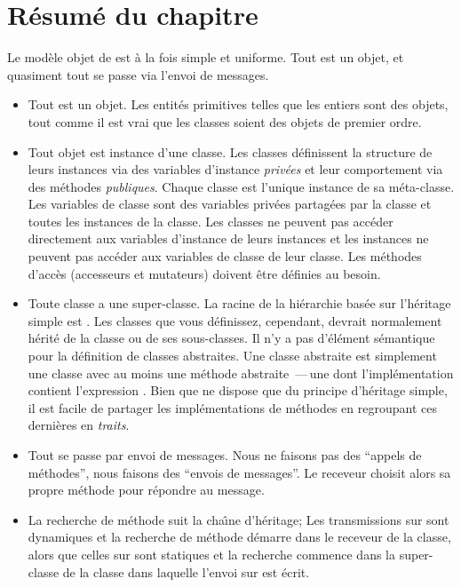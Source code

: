 \documentclass[a4paper,10pt,twoside]{book}
\begin{document}
\section{R\'esum\'e du chapitre}

Le mod\`ele objet de \squeak est \`a la fois simple et uniforme.
Tout est un objet, et quasiment tout se passe via l'envoi de messages.

\begin{itemize}
  \item Tout est un objet.
  Les entit\'es primitives telles que les entiers sont des objets, tout comme
il est vrai que les classes soient des objets de premier ordre.

  \item Tout objet est instance d'une classe.
Les classes d\'efinissent la structure de leurs instances via des
variables d'instance \emph{priv\'ees} et leur comportement 
via des m\'ethodes \emph{publiques}. Chaque classe est l'unique
instance de sa m\'eta-classe.
Les variables de classe sont des variables priv\'ees partag\'ees par la classe
et toutes les instances de la classe.
Les classes ne peuvent pas acc\'eder directement aux variables d'instance de
leurs instances et les instances ne peuvent pas acc\'eder aux variables de
classe de leur classe.
Les m\'ethodes d'acc\`es (accesseurs et mutateurs) doivent \^etre
d\'efinies au besoin.  

  \item Toute classe a une super-classe.
  La racine de la hi\'erarchie bas\'ee sur l'h\'eritage simple est .
	Les classes que vous d\'efinissez, cependant, devrait normalement h\'erit\'e de la classe  ou de ses sous-classes.
Il n'y a pas d'\'el\'ement s\'emantique pour la d\'efinition de classes abstraites.
Une classe abstraite est simplement une classe avec au moins une  
m\'ethode abstraite
\,---\,une dont l'impl\'ementation contient l'expression 
.
  Bien que \squeak ne dispose que du principe d'h\'eritage simple, 
il est facile de partager les impl\'ementations de m\'ethodes
en regroupant ces derni\`eres en
\emph{traits}.

  \item Tout se passe par envoi de messages.
	Nous ne faisons pas des ``appels de m\'ethodes'', nous
	faisons des ``envois de messages''.
Le receveur choisit alors sa propre m\'ethode pour r\'epondre au message.

  \item La recherche de m\'ethode suit la cha\^{\i}ne d'h\'eritage;
  Les transmissions sur \self sont dynamiques et la recherche de m\'ethode
d\'emarre dans le receveur de la classe, alors que
celles sur \super sont statiques
et la recherche commence dans la super-classe de la classe dans laquelle l'envoi
sur \super est \'ecrit.


\end{itemize}
\end{document}
